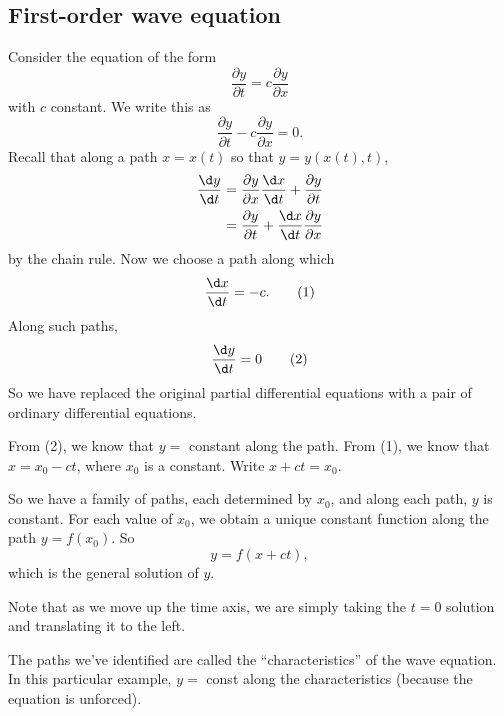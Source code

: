 \documentclass[a4paper]{article}
\begin{document}
    \subsection{First-order wave equation}
    Consider the equation of the form
    \[
      \frac{\partial y}{\partial t} = c\frac{\partial y}{\partial x}
    \]
    with $c$ constant. We write this as
    \[
      \frac{\partial y}{\partial t} - c\frac{\partial y}{\partial x} = 0.
    \]
    Recall that along a path $x = x(t)$ so that $y = y(x(t), t)$,
    \begin{align*}
      \frac{\d y}{\d t} &= \frac{\partial y}{\partial x}\frac{\d x}{\d t} + \frac{\partial y}{\partial t}\\
      &= \frac{\partial y}{\partial t} + \frac{\d x}{\d t}\frac{\partial y}{\partial x}
    \end{align*}
    by the chain rule. Now we choose a path along which
    \[
      \frac{\d x}{\d t} = -c. \tag{1}
    \] Along such paths,
    \[
      \frac{\d y}{\d t} = 0 \tag{2}
    \]
    So we have replaced the original partial differential equations with a pair of ordinary differential equations.

    From (2), we know that $y = $ constant along the path. From (1), we know that $x = x_0 - ct$, where $x_0$ is a constant. Write $x + ct = x_0$.

    So we have a family of paths, each determined by $x_0$, and along each path, $y$ is constant. For each value of $x_0$, we obtain a unique constant function along the path $y = f(x_0)$. So
    \[
      y = f(x + ct),
    \]
    which is the general solution of $y$.

    \begin{center}
    \end{center}

    Note that as we move up the time axis, we are simply taking the $t = 0$ solution and translating it to the left.

    The paths we've identified are called the ``characteristics'' of the wave equation. In this particular example, $y =$ const along the characteristics (because the equation is unforced).
\end{document}

